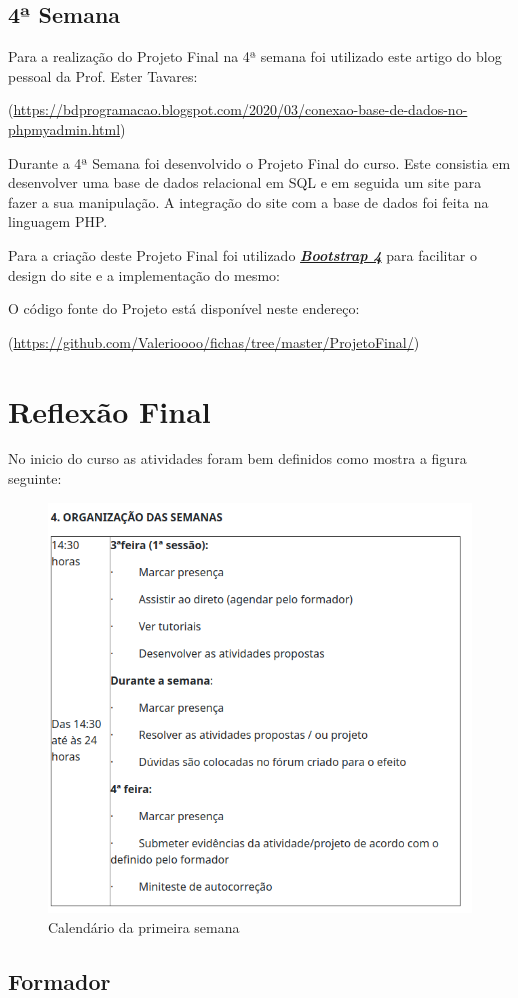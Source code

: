 \documentclass[14pt]{article}
\begin{document}
\subsection{4ª Semana}

Para a realização do Projeto Final na 4ª semana foi utilizado este artigo do blog pessoal da Prof. Ester Tavares:

(\url{https://bdprogramacao.blogspot.com/2020/03/conexao-base-de-dados-no-phpmyadmin.html})

Durante a 4ª Semana foi desenvolvido o Projeto Final do curso.
Este consistia em desenvolver uma base de dados relacional em SQL e em seguida um site para fazer a sua manipulação.
A integração do site com a base de dados foi feita na linguagem PHP.

Para a criação deste Projeto Final foi utilizado \href{https://getbootstrap.com/}{\textbf{\textit{Bootstrap 4}}} para facilitar o design do site e a implementação do mesmo:


O código fonte do Projeto está disponível neste endereço:

(\url{https://github.com/Valerioooo/fichas/tree/master/ProjetoFinal/})


\newpage
\section{Reflexão Final}

No inicio do curso as atividades foram bem definidos como mostra a figura seguinte:

\begin{figure}[H]
    \centering
    \includegraphics[width=0.45\linewidth]{cal.png}
    \caption{Calendário da primeira semana}
    \label{fig:cal}
\end{figure}


\subsection{Formador}
\end{document}
